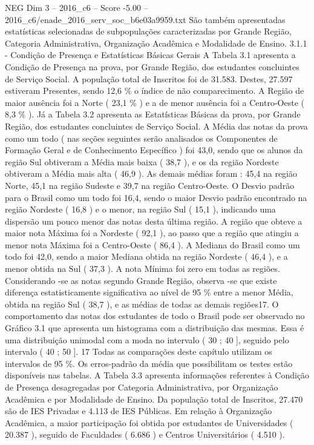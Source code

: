 \begin{textsample}{NEG Dim 3 – 2016\_c6 – Score -5.00 – 2016\_c6/enade\_2016\_serv\_soc\_b6e03a9959.txt}
São também apresentadas estatísticas selecionadas de subpopulações caracterizadas por Grande Região, Categoria Administrativa, Organização Acadêmica e Modalidade de Ensino. 3.1.1 - Condição de Presença e Estatísticas Básicas Gerais A Tabela 3.1 apresenta a Condição de Presença na prova, por Grande Região, dos estudantes concluintes de Serviço Social.
A população total de Inscritos foi de 31.583.
Destes, 27.597 estiveram Presentes, sendo 12,6 \% o índice de não comparecimento.
A Região de maior ausência foi a Norte ( 23,1 \% ) e a de menor ausência foi a Centro-Oeste ( 8,3 \% ).
Já a Tabela 3.2 apresenta as Estatísticas Básicas da prova, por Grande Região, dos estudantes concluintes de Serviço Social.
A Média das notas da prova como um todo ( nas seções seguintes serão analisados os Componentes de Formação Geral e de Conhecimento Específico ) foi 43,0, sendo que os alunos da região Sul obtiveram a Média mais baixa ( 38,7 ), e os da região Nordeste obtiveram a Média mais alta ( 46,9 ).
As demais médias foram : 45,4 na região Norte, 45,1 na região Sudeste e 39,7 na região Centro-Oeste.
O Desvio padrão para o Brasil como um todo foi 16,4, sendo o maior Desvio padrão encontrado na região Nordeste ( 16,8 ) e o menor, na região Sul ( 15,1 ), indicando uma dispersão um pouco menor das notas desta última região.
A região que obteve a maior nota Máxima foi a Nordeste ( 92,1 ), ao passo que a região que atingiu a menor nota Máxima foi a Centro-Oeste ( 86,4 ).
A Mediana do Brasil como um todo foi 42,0, sendo a maior Mediana obtida na região Nordeste ( 46,4 ), e a menor obtida na Sul ( 37,3 ).
A nota Mínima foi zero em todas as regiões.
Considerando -se as notas segundo Grande Região, observa -se que existe diferença estatisticamente significativa ao nível de 95 \% entre a menor Média, obtida na região Sul ( 38,7 ), e as médias de todas as demais regiões17.
O comportamento das notas dos estudantes de todo o Brasil pode ser observado no Gráfico 3.1 que apresenta um histograma com a distribuição das mesmas.
Essa é uma distribuição unimodal com a moda no intervalo ( 30 ; 40 ], seguido pelo intervalo ( 40 ; 50 ]. 17 Todas as comparações deste capítulo utilizam os intervalos de 95 \%.
Os erros-padrão da média que possibilitam os testes estão disponíveis nas tabelas.
A Tabela 3.3 apresenta informações referentes à Condição de Presença desagregadas por Categoria Administrativa, por Organização Acadêmica e por Modalidade de Ensino.
Da população total de Inscritos, 27.470 são de IES Privadas e 4.113 de IES Públicas.
Em relação à Organização Acadêmica, a maior participação foi obtida por estudantes de Universidades ( 20.387 ), seguido de Faculdades ( 6.686 ) e Centros Universitários ( 4.510 ).

\end{textsample}

